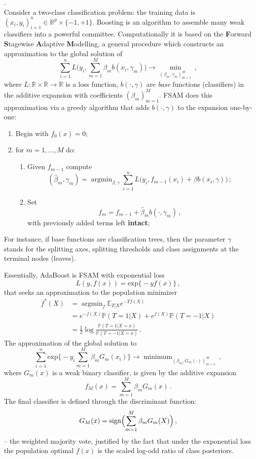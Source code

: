 \documentclass[a4paper]{article}
\newcommand{\Real}{\mathbb{R}}
\newcommand{\ex}{\mathbb{E}}
\newcommand{\pr}{\mathbb{P}}
\newcommand{\argmin}{\mathop{\text{argmin}}}
\begin{document}
 .\hfill\\
Consider a two-class classification problem: the training data is $(x_i, y_i)_{i=1}^n
\in \Real^p \times \{-1,+1\}$. Boosting is an algorithm to assemble many weak classifiers
into a powerful committee. Computationally it is based on the \textbf{F}orward
\textbf{S}tagewise \textbf{A}daptive \textbf{M}odelling, a general procedure which
constructs an approximation to the global solution of
\[
\sum_{i=1}^n L\bigl( y_i, \sum_{m=1}^M \beta_m b(x_i,\gamma_m) \bigr)
	\to \min_{(\beta_m,\gamma_m)_{m=1}^M}\,,
\]
where $ L:\Real\times \Real\to \Real$ is a loss function, $b(\cdot,\gamma)$ are
\emph{base} functions (classifiers) in the additive expansion with coefficients
$(\beta_m)_{m=1}^M$. FSAM does this approximation via a greedy algorithm that adds
$b(\cdot,\gamma)$ to the expansion one-by-one: \begin{enumerate}
	\item Begin with $f_0(x) = 0$;
	\item for $m=1,\ldots, M$ do: \begin{enumerate}
		\item Given $f_{m-1}$ compute 
		\[
			( \hat{\beta}_m, \gamma_m)
			= \argmin_{\beta,\gamma} \sum_{i=1}^n
				L\bigl( y_i, f_{m-1}(x_i) + \beta b(x_i,\gamma) \bigr)\,;
		\]
		\item Set
		\[ f_m = f_{m-1} + \hat{\beta}_m b(\cdot,\gamma_m)\,, \]
		with previously added terms left \textbf{intact};
	\end{enumerate}
\end{enumerate}
For instance, if base functions are classification trees, then the parameter $\gamma$
stands for the splitting axes, splitting thresholds and class assignments at the
terminal nodes (leaves).

Essentially, AdaBoost is FSAM with exponential loss
\[ L(y,f(x)) = \text{exp}\bigl\{ -y f(x) \bigr\}\,, \]
that seeks an approximation to the population minimizer
\begin{align*}
	f^*(X) &= \argmin_f \ex_{T|X} e^{ - T f(X) } \\
	&= e^{-f(X)} \pr(T=1|X) + e^{f(X)} \pr(T=-1|X)\\
	&= \frac{1}{2} \log\frac{ \pr(T=1|X=x) }{ \pr(T=-1|X=x) } \,.
\end{align*}
The approximation of the global solution to
\[
\sum_{i=1}^n \text{exp}\bigl\{ - y_i \sum_{m=1}^M \beta_m G_m(x_i) \bigr\}
\to \mathop{\text{minimum}}_{ (\beta_m, G_m(\cdot))_{m=1}^M }\,,
\]
where $G_m(x)$ is a weak binary classifier, is given by the additive expansion
\[ f_M(x) = \sum_{m=1}^M \beta_m G_m(x) \,. \]
The final classifier is defined through the discriminant function:
\[
G_M(x)
= \text{sign} \Bigl( \sum_{m=1}^M \beta_m G_m(X) \Bigr) \,,
\]
-- the weighted majority vote, justified by the fact that under the exponential 
loss the population optimal $f(x)$ is the scaled log-odd ratio of class posteriors.\hfill\\
\end{document}
